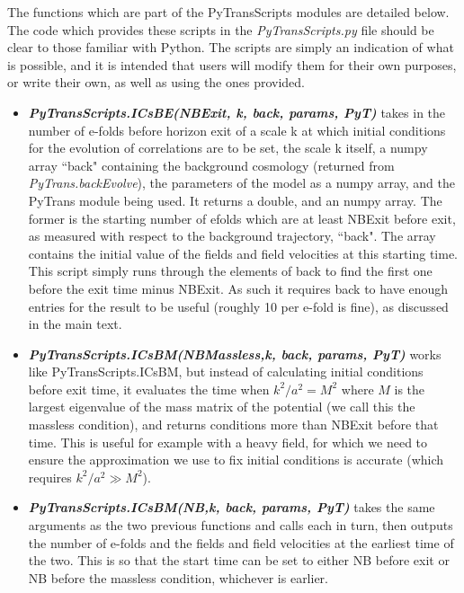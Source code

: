 \documentclass[10pt,
amsmath,amssymb,
aps,prd,nofootinbib,eqsecnum,a4paper]{revtex4}
\begin{document}
The functions which are part of the PyTransScripts modules are detailed below. The code 
which provides these scripts in the {\it PyTransScripts.py} file should be clear to those familiar with Python. The scripts are  
simply an indication of what is possible, and it is intended that users will modify them for their own purposes, or 
write their own, as well as using the ones provided. 

\begin{itemize}
\item   { \it \bf PyTransScripts.ICsBE(NBExit, k, back, params, PyT)} takes in the number of e-folds before horizon exit of a scale k at 
which initial conditions for the evolution of correlations are to be set, the scale k itself, a numpy array ``back" containing 
the background cosmology (returned from {\it PyTrans.backEvolve}), the parameters of the model
as a numpy array, and the PyTrans module being used. It returns a double, and an numpy array. The former is 
the starting number of efolds which are at least NBExit before exit, as measured with respect to the background trajectory, ``back". The array contains the initial value of the fields and field velocities at this starting time. This script simply runs through the elements of 
back to find the first one before the exit time minus NBExit. As such 
it requires back to have enough entries for the result to be 
useful (roughly 10 per e-fold is fine), as discussed in the main text. 

\item { \it \bf PyTransScripts.ICsBM(NBMassless,k, back, params, PyT)} works like PyTransScripts.ICsBM, but instead of calculating initial conditions before 
exit time, it evaluates the time when $k^2/a^2 = M^2$ where $M$ is the largest eigenvalue of the mass matrix of the potential (we call this the massless condition), and returns conditions 
more than NBExit before that time. This is useful for example with a heavy field, for which we need to ensure the approximation we use to 
fix initial conditions is accurate (which requires $k^2/a^2 \gg M^2$).

\item { \it \bf PyTransScripts.ICsBM(NB,k, back, params, PyT)}  takes the same arguments as the two previous 
functions and calls each in turn, then outputs the number of e-folds and the fields and field velocities at the earliest time of the two. 
This is so that the start time can be set to either NB before exit or NB before the massless condition, whichever  is earlier.


\end{itemize}
\end{document}
